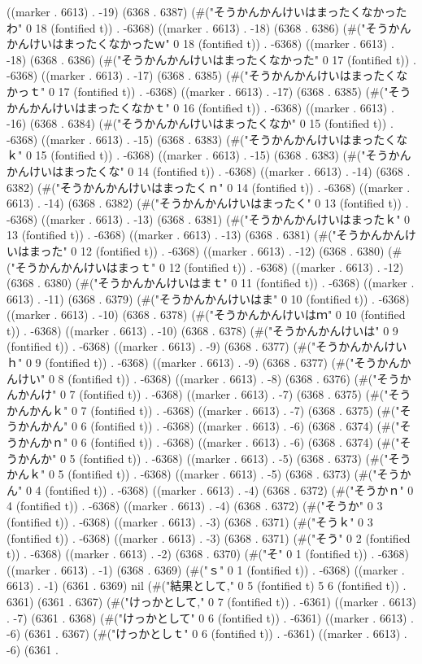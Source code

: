 ((marker . 6613) . -19) (6368 . 6387) (#("そうかんかんけいはまったくなかったわ" 0 18 (fontified t)) . -6368) ((marker . 6613) . -18) (6368 . 6386) (#("そうかんかんけいはまったくなかったｗ" 0 18 (fontified t)) . -6368) ((marker . 6613) . -18) (6368 . 6386) (#("そうかんかんけいはまったくなかった" 0 17 (fontified t)) . -6368) ((marker . 6613) . -17) (6368 . 6385) (#("そうかんかんけいはまったくなかっｔ" 0 17 (fontified t)) . -6368) ((marker . 6613) . -17) (6368 . 6385) (#("そうかんかんけいはまったくなかｔ" 0 16 (fontified t)) . -6368) ((marker . 6613) . -16) (6368 . 6384) (#("そうかんかんけいはまったくなか" 0 15 (fontified t)) . -6368) ((marker . 6613) . -15) (6368 . 6383) (#("そうかんかんけいはまったくなｋ" 0 15 (fontified t)) . -6368) ((marker . 6613) . -15) (6368 . 6383) (#("そうかんかんけいはまったくな" 0 14 (fontified t)) . -6368) ((marker . 6613) . -14) (6368 . 6382) (#("そうかんかんけいはまったくｎ" 0 14 (fontified t)) . -6368) ((marker . 6613) . -14) (6368 . 6382) (#("そうかんかんけいはまったく" 0 13 (fontified t)) . -6368) ((marker . 6613) . -13) (6368 . 6381) (#("そうかんかんけいはまったｋ" 0 13 (fontified t)) . -6368) ((marker . 6613) . -13) (6368 . 6381) (#("そうかんかんけいはまった" 0 12 (fontified t)) . -6368) ((marker . 6613) . -12) (6368 . 6380) (#("そうかんかんけいはまっｔ" 0 12 (fontified t)) . -6368) ((marker . 6613) . -12) (6368 . 6380) (#("そうかんかんけいはまｔ" 0 11 (fontified t)) . -6368) ((marker . 6613) . -11) (6368 . 6379) (#("そうかんかんけいはま" 0 10 (fontified t)) . -6368) ((marker . 6613) . -10) (6368 . 6378) (#("そうかんかんけいはｍ" 0 10 (fontified t)) . -6368) ((marker . 6613) . -10) (6368 . 6378) (#("そうかんかんけいは" 0 9 (fontified t)) . -6368) ((marker . 6613) . -9) (6368 . 6377) (#("そうかんかんけいｈ" 0 9 (fontified t)) . -6368) ((marker . 6613) . -9) (6368 . 6377) (#("そうかんかんけい" 0 8 (fontified t)) . -6368) ((marker . 6613) . -8) (6368 . 6376) (#("そうかんかんけ" 0 7 (fontified t)) . -6368) ((marker . 6613) . -7) (6368 . 6375) (#("そうかんかんｋ" 0 7 (fontified t)) . -6368) ((marker . 6613) . -7) (6368 . 6375) (#("そうかんかん" 0 6 (fontified t)) . -6368) ((marker . 6613) . -6) (6368 . 6374) (#("そうかんかｎ" 0 6 (fontified t)) . -6368) ((marker . 6613) . -6) (6368 . 6374) (#("そうかんか" 0 5 (fontified t)) . -6368) ((marker . 6613) . -5) (6368 . 6373) (#("そうかんｋ" 0 5 (fontified t)) . -6368) ((marker . 6613) . -5) (6368 . 6373) (#("そうかん" 0 4 (fontified t)) . -6368) ((marker . 6613) . -4) (6368 . 6372) (#("そうかｎ" 0 4 (fontified t)) . -6368) ((marker . 6613) . -4) (6368 . 6372) (#("そうか" 0 3 (fontified t)) . -6368) ((marker . 6613) . -3) (6368 . 6371) (#("そうｋ" 0 3 (fontified t)) . -6368) ((marker . 6613) . -3) (6368 . 6371) (#("そう" 0 2 (fontified t)) . -6368) ((marker . 6613) . -2) (6368 . 6370) (#("そ" 0 1 (fontified t)) . -6368) ((marker . 6613) . -1) (6368 . 6369) (#("ｓ" 0 1 (fontified t)) . -6368) ((marker . 6613) . -1) (6361 . 6369) nil (#("結果として," 0 5 (fontified t) 5 6 (fontified t)) . 6361) (6361 . 6367) (#("けっかとして," 0 7 (fontified t)) . -6361) ((marker . 6613) . -7) (6361 . 6368) (#("けっかとして" 0 6 (fontified t)) . -6361) ((marker . 6613) . -6) (6361 . 6367) (#("けっかとしｔ" 0 6 (fontified t)) . -6361) ((marker . 6613) . -6) (6361 . 